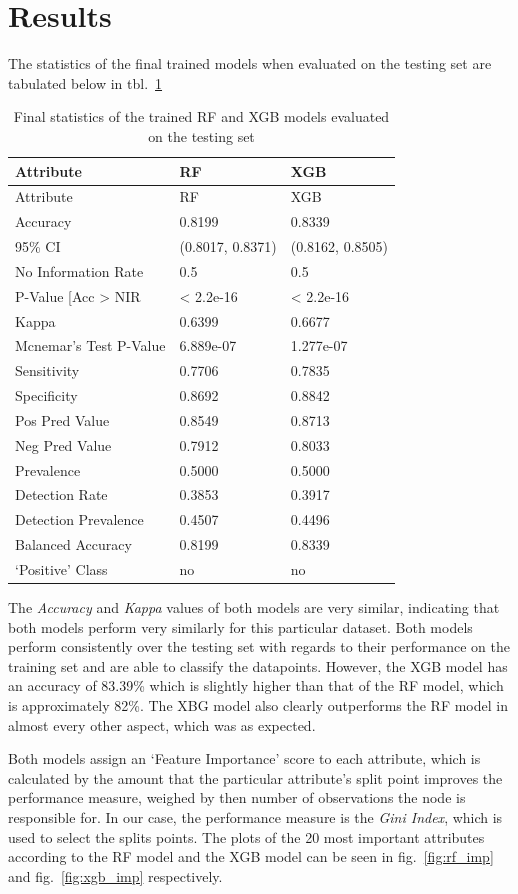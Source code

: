 \documentclass[runningheads]{llncs}
\begin{document}
\hypertarget{results}{%
\section{Results}\label{results}}

The statistics of the final trained models when evaluated on the testing
set are tabulated below in tbl.~\ref{tbl:model_stats}

\hypertarget{tbl:model_stats}{}
\begin{longtable}[]{@{}lll@{}}
\caption{\label{tbl:model_stats}Final statistics of the trained RF and
XGB models evaluated on the testing set}\tabularnewline
\toprule
Attribute & RF & XGB\tabularnewline
\midrule
\endfirsthead
\toprule
Attribute & RF & XGB\tabularnewline
\midrule
\endhead
Accuracy & 0.8199 & 0.8339\tabularnewline
95\% CI & (0.8017, 0.8371) & (0.8162, 0.8505)\tabularnewline
No Information Rate & 0.5 & 0.5\tabularnewline
P-Value {[}Acc \textgreater{} NIR & \textless{} 2.2e-16 & \textless{}
2.2e-16\tabularnewline
Kappa & 0.6399 & 0.6677\tabularnewline
Mcnemar's Test P-Value & 6.889e-07 & 1.277e-07\tabularnewline
Sensitivity & 0.7706 & 0.7835\tabularnewline
Specificity & 0.8692 & 0.8842\tabularnewline
Pos Pred Value & 0.8549 & 0.8713\tabularnewline
Neg Pred Value & 0.7912 & 0.8033\tabularnewline
Prevalence & 0.5000 & 0.5000\tabularnewline
Detection Rate & 0.3853 & 0.3917\tabularnewline
Detection Prevalence & 0.4507 & 0.4496\tabularnewline
Balanced Accuracy & 0.8199 & 0.8339\tabularnewline
`Positive' Class & no & no\tabularnewline
\bottomrule
\end{longtable}

The \emph{Accuracy} and \emph{Kappa} values of both models are very
similar, indicating that both models perform very similarly for this
particular dataset. Both models perform consistently over the testing
set with regards to their performance on the training set and are able
to classify the datapoints. However, the XGB model has an accuracy of
83.39\% which is slightly higher than that of the RF model, which is
approximately 82\%. The XBG model also clearly outperforms the RF model
in almost every other aspect, which was as expected.

Both models assign an `Feature Importance' score to each attribute,
which is calculated by the amount that the particular attribute's split
point improves the performance measure, weighed by then number of
observations the node is responsible for. In our case, the performance
measure is the \emph{Gini Index}, which is used to select the splits
points. The plots of the 20 most important attributes according to the
RF model and the XGB model can be seen in fig.~\ref{fig:rf_imp} and
fig.~\ref{fig:xgb_imp} respectively.
\end{document}
